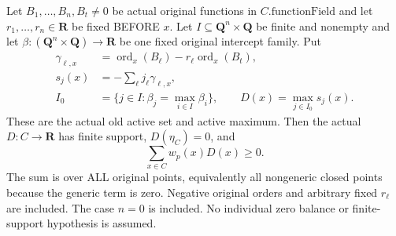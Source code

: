\begin{theorem}
\label{thm:gauss-common-leading-global-weighted-max}
\leanok
Let $B_1,\ldots,B_n,B_t\ne0$ be actual original functions in
$C.\mathrm{functionField}$ and let $r_1,\ldots,r_n\in\mathbf R$ be
fixed BEFORE $x$. Let $I\subseteq\mathbf Q^n\times\mathbf Q$ be finite
and nonempty and let $\beta:(\mathbf Q^n\times\mathbf Q)\to\mathbf R$
be one fixed original intercept family. Put
\[
 \begin{split}
  \gamma_{\ell,x}&=\operatorname{ord}_x(B_\ell)
                   -r_\ell\operatorname{ord}_x(B_t),\\
  s_j(x)&=-\sum_\ell j_\ell\gamma_{\ell,x},\\
  I_0&=\{j\in I:\beta_j=\max_{i\in I}\beta_i\},\qquad
  D(x)=\max_{j\in I_0}s_j(x).
 \end{split}
\]
These are the actual old active set and active maximum. Then the actual
$D:C\to\mathbf R$ has finite support, $D(\eta_C)=0$, and
\[
 \sum_{x\in C}w_p(x)D(x)\ge0.
\]
The sum is over ALL original points, equivalently all nongeneric closed
points because the generic term is zero. Negative original orders and
arbitrary fixed $r_\ell$ are included. The case $n=0$ is included.
No individual zero balance or finite-support hypothesis is assumed.
\end{theorem}
